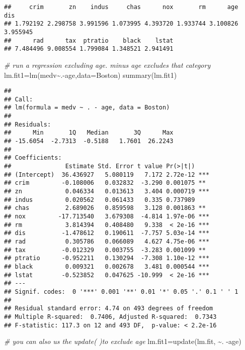 \documentclass[
]{article}
\newenvironment{Shaded}{\begin{snugshade}}{\end{snugshade}}
\newcommand{\AttributeTok}[1]{\textcolor[rgb]{0.77,0.63,0.00}{#1}}
\newcommand{\CommentTok}[1]{\textcolor[rgb]{0.56,0.35,0.01}{\textit{#1}}}
\newcommand{\FunctionTok}[1]{\textcolor[rgb]{0.00,0.00,0.00}{#1}}
\newcommand{\NormalTok}[1]{#1}
\newcommand{\OtherTok}[1]{\textcolor[rgb]{0.56,0.35,0.01}{#1}}
\newcommand{\SpecialCharTok}[1]{\textcolor[rgb]{0.00,0.00,0.00}{#1}}
\begin{document}
\begin{verbatim}
##     crim       zn    indus     chas      nox       rm      age      dis 
## 1.792192 2.298758 3.991596 1.073995 4.393720 1.933744 3.100826 3.955945 
##      rad      tax  ptratio    black    lstat 
## 7.484496 9.008554 1.799084 1.348521 2.941491
\end{verbatim}

\begin{Shaded}
\begin{Highlighting}[]
\CommentTok{\# run a regression excluding age. minus age excludes that category}
\NormalTok{lm.fit1}\OtherTok{=}\FunctionTok{lm}\NormalTok{(medv}\SpecialCharTok{\textasciitilde{}}\NormalTok{.}\SpecialCharTok{{-}}\NormalTok{age,}\AttributeTok{data=}\NormalTok{Boston)}
\FunctionTok{summary}\NormalTok{(lm.fit1)}
\end{Highlighting}
\end{Shaded}

\begin{verbatim}
## 
## Call:
## lm(formula = medv ~ . - age, data = Boston)
## 
## Residuals:
##      Min       1Q   Median       3Q      Max 
## -15.6054  -2.7313  -0.5188   1.7601  26.2243 
## 
## Coefficients:
##               Estimate Std. Error t value Pr(>|t|)    
## (Intercept)  36.436927   5.080119   7.172 2.72e-12 ***
## crim         -0.108006   0.032832  -3.290 0.001075 ** 
## zn            0.046334   0.013613   3.404 0.000719 ***
## indus         0.020562   0.061433   0.335 0.737989    
## chas          2.689026   0.859598   3.128 0.001863 ** 
## nox         -17.713540   3.679308  -4.814 1.97e-06 ***
## rm            3.814394   0.408480   9.338  < 2e-16 ***
## dis          -1.478612   0.190611  -7.757 5.03e-14 ***
## rad           0.305786   0.066089   4.627 4.75e-06 ***
## tax          -0.012329   0.003755  -3.283 0.001099 ** 
## ptratio      -0.952211   0.130294  -7.308 1.10e-12 ***
## black         0.009321   0.002678   3.481 0.000544 ***
## lstat        -0.523852   0.047625 -10.999  < 2e-16 ***
## ---
## Signif. codes:  0 '***' 0.001 '**' 0.01 '*' 0.05 '.' 0.1 ' ' 1
## 
## Residual standard error: 4.74 on 493 degrees of freedom
## Multiple R-squared:  0.7406, Adjusted R-squared:  0.7343 
## F-statistic: 117.3 on 12 and 493 DF,  p-value: < 2.2e-16
\end{verbatim}

\begin{Shaded}
\begin{Highlighting}[]
\CommentTok{\# you can also us the update( )to exclude age}
\NormalTok{lm.fit1}\OtherTok{=}\FunctionTok{update}\NormalTok{(lm.fit, }\SpecialCharTok{\textasciitilde{}}\NormalTok{. }\SpecialCharTok{{-}}\NormalTok{age)}
\end{Highlighting}
\end{Shaded}
\end{document}
